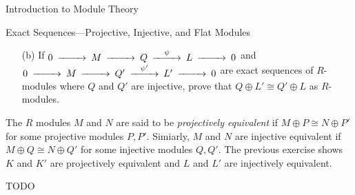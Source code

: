 \begin{chapter}{Introduction to Module Theory}
\begin{section}{Exact Sequences---Projective, Injective, and Flat Modules}
\begin{problem}
\begin{enumerate}
\item[(b)] If $\begin{CD}0@>>>M@>>>Q@>\psi>>L@>>>0\end{CD}$ and $\begin{CD}0@>>>M@>>>Q'@>\psi'>>L'@>>>0\end{CD}$ are exact sequences of $R$-modules where $Q$ and $Q'$ are injective, prove that $Q\oplus L' \cong Q'\oplus L$ as $R$-modules.
\end{enumerate}

The $R$ modules $M$ and $N$ are said to be \emph{projectively equivalent} if $M\oplus P\cong N\oplus P'$ for some projective modules $P,P'$. Simiarly, $M$ and $N$ are injective equivalent if $M\oplus Q\cong N\oplus Q'$ for some injective modules $Q,Q'$. The previous exercise shows $K$ and $K'$ are projectively equivalent and $L$ and $L'$ are injectively equivalent. 
\end{problem}
\begin{solution}TODO

\end{solution}\oneperpage



\end{section}




















\end{chapter}
